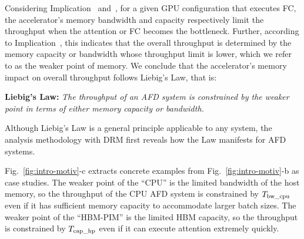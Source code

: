 Considering Implication~\uppercase\expandafter{} and~\uppercase\expandafter{}, 
for a given GPU configuration that executes FC, 
the accelerator's memory bandwidth and capacity respectively limit the throughput when the attention or FC becomes the bottleneck. 
Further, according to Implication~\uppercase\expandafter{}, this indicates that the overall throughput is determined by the memory capacity or bandwidth whose throughput limit is lower,
which we refer to as the weaker point of memory.
We conclude that the accelerator's memory impact on overall throughput follows Liebig's Law, that is:

\begin{mdframed}[backgroundcolor=gray!10,linecolor=black,linewidth=1pt]
\textbf{Liebig's Law:}
\textit{The throughput of an AFD system is constrained by the weaker point in terms of either memory capacity or bandwidth.
}
\end{mdframed}
Although Liebig's Law is a general principle applicable to any system, the analysis methodology with DRM first reveals how the Law manifests for AFD systems.







Fig.~\ref{fig:intro-motiv}-c extracts concrete examples from Fig.~\ref{fig:intro-motiv}-b as case studies. 
The weaker point of the ``CPU'' is the limited bandwidth of the host memory, 
so the throughput of the CPU AFD system is constrained by $T_{\rm \text{bw\_cpu}}$ even if it has sufficient memory capacity to accommodate larger batch sizes. 
The weaker point of the ``HBM-PIM'' is the limited HBM capacity, so the throughput is constrained by $T_{\rm \text{cap\_hp}}$ even if it can execute attention extremely quickly.








